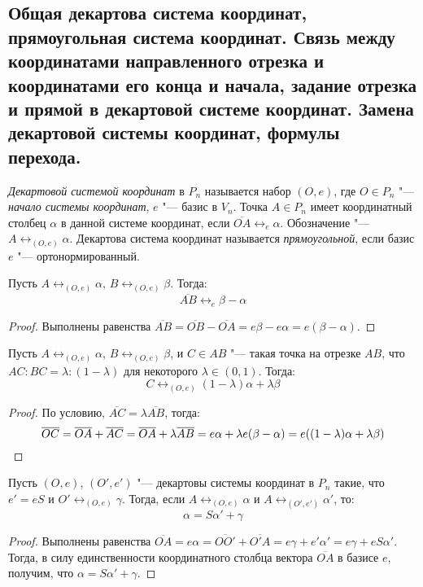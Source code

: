 \subsection{Общая декартова система координат, прямоугольная система координат. Связь между координатами направленного отрезка и координатами его конца и начала, задание отрезка и прямой в декартовой системе координат. Замена декартовой системы координат, формулы перехода.}

    \begin{definition}
    	\textit{Декартовой системой координат} в $P_n$ называется набор $(O, e)$, где $O \in P_n$ "--- \textit{начало системы координат}, $e$ "--- базис в $V_n$. Точка $A \in P_n$ имеет координатный столбец $\alpha$ в данной системе координат, если $\overline{OA} \leftrightarrow_e \alpha$. Обозначение "--- $A \leftrightarrow_{(O, e)} \alpha$. Декартова система координат называется \textit{прямоугольной}, если базис $e$ "--- ортонормированный.
    \end{definition}
    
    \begin{proposition}
    	Пусть $A \leftrightarrow_{(O, e)} \alpha$, $B \leftrightarrow_{(O, e)} \beta$.  Тогда:
    	\[\overline{AB} \leftrightarrow_e \beta - \alpha\]
    \end{proposition}
    
    \begin{proof}
    	Выполнены равенства $\overline{AB} = \overline{OB} - \overline{OA} = e\beta - e\alpha = e(\beta - \alpha)$.
    \end{proof}
    
    \begin{proposition}
    	Пусть $A \leftrightarrow_{(O, e)} \alpha$, $B \leftrightarrow_{(O, e)} \beta$, и $C \in AB$ "--- такая точка на отрезке $AB$, что $AC : BC = \lambda : (1 - \lambda)$ для некоторого $\lambda \in (0, 1)$. Тогда:
    	\[C \leftrightarrow_{(O, e)} (1 - \lambda) \alpha + \lambda \beta\]
    \end{proposition}
    
    \begin{proof}
    	По условию, $\overline{AC} = \lambda \overline{AB}$, тогда:
    	\[\overline{OC} = \overline{OA} + \overline{AC} = \overline{OA} + \lambda \overline{AB} = e\alpha + \lambda e(\beta - \alpha) = e((1 - \lambda) \alpha + \lambda \beta)\qedhere\]
    \end{proof}
    
    \begin{theorem}
    	Пусть $(O, e)$, $(O', e')$ "--- декартовы системы координат в $P_n$ такие, что $e' = eS$ и $O' \leftrightarrow_{(O, e)} \gamma$. Тогда, если $A \leftrightarrow_{(O, e)} \alpha$ и $A \leftrightarrow_{(O', e')} \alpha'$, то:
    	\[\alpha = S\alpha' + \gamma\]
    \end{theorem}
    
    \begin{proof}
    	Выполнены равенства $\overline{OA} = e\alpha = \overline{OO'} + \overline{O'A} = e\gamma + e'\alpha' = e\gamma + eS\alpha'$. Тогда, в силу единственности координатного столбца вектора $\overline{OA}$ в базисе $e$, получим, что $\alpha =  S\alpha' + \gamma$.
    \end{proof}